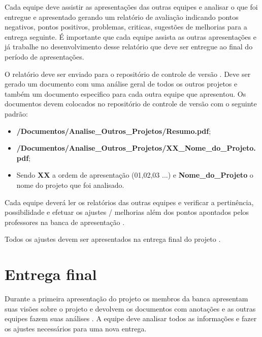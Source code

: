 Cada equipe deve assistir as apresentações das outras equipes e analisar o que foi entregue e apresentado gerando um relatório de avaliação indicando pontos negativos, pontos positivos, problemas, criticas, sugestões de melhorias para a entrega seguinte. É importante que cada equipe assista as outras apresentações e já trabalhe no desenvolvimento desse relatório que deve ser entregue ao final do período de apresentações.

O relatório deve ser enviado para o repositório de controle de versão . Deve ser gerado um documento com uma análise geral de todos os outros projetos e também um documento especifico para cada outra equipe que apresentou. 
Os documentos devem colocados no repositório de controle de versão com o seguinte padrão:
\begin{itemize}
    \item \textbf{/Documentos/Analise\_Outros\_Projetos/Resumo.pdf};
    
    \item \textbf{/Documentos/Analise\_Outros\_Projetos/XX\_Nome\_do\_Projeto.pdf};
    
    \item Sendo \textbf{XX} a ordem de apresentação (01,02,03 ...) e \textbf{Nome\_do\_Projeto} o nome do projeto que foi analisado.
\end{itemize}

 Cada equipe deverá ler os relatórios das outras equipes e verificar a pertinência, possibilidade e efetuar os ajustes / melhorias além dos pontos apontados pelos professores na banca de apresentação .

Todos os ajustes devem ser apresentados na entrega final do projeto .

\section{Entrega final}\label{atv-entrega-final}

Durante a primeira apresentação do projeto  os membros da banca apresentam suas visões sobre o projeto e devolvem os documentos com anotações e as outras equipes fazem suas análises . A equipe deve analisar todos as informações e fazer os ajustes necessários para uma nova entrega.


